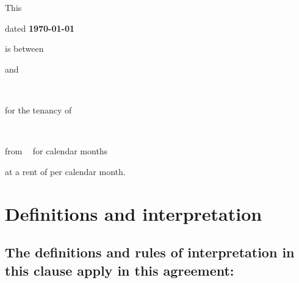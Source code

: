 \usepackage{setspace}

\raggedright

\raggedbottom

\setlength{\footskip}{50pt}

\usepackage{verbatim}

\usepackage{sectsty}

\allsectionsfont{\normalsize\mdseries}
\sectionfont{\MakeUppercase} %

\usepackage{enumitem}




\vspace{.5cm}

\begin{center}
This \textbf{\TitleText} \par dated \textbf{\today} 

is between \par \textbf{\Landlord}  \par and %
\par   \textbf{\Tenant \ \EtAl} \par for the tenancy of  

\textbf{\Address\ } \par from \textbf{\StartDate\  } 
for \textbf{\Term} calendar months 

at a rent of \textbf{\textsterling \Rent} per calendar month.
\end{center}

\section{Definitions and interpretation}

\subsection{The definitions and rules of interpretation in this clause apply in this
agreement:}

